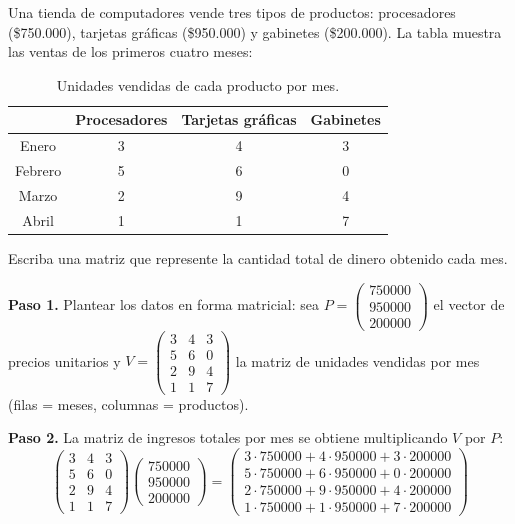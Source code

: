 \begin{example}
Una tienda de computadores vende tres tipos de productos: procesadores (\$750.000), tarjetas gráficas (\$950.000) y gabinetes (\$200.000). La tabla muestra las ventas de los primeros cuatro meses:

\begin{table}[H]\centering
\begin{tabular}{|c||c|c|c|}\hline
& Procesadores & Tarjetas gráficas & Gabinetes\\\hline
Enero & 3 & 4 & 3\\
Febrero & 5 & 6 & 0\\
Marzo & 2 & 9 & 4\\
Abril & 1 & 1 & 7\\\hline
\end{tabular}
\caption{Unidades vendidas de cada producto por mes.}
\end{table}

Escriba una matriz que represente la cantidad total de dinero obtenido cada mes.

\begin{myproof}
\textbf{Paso 1.} Plantear los datos en forma matricial: sea $P = \begin{pmatrix} 750000 \\ 950000 \\ 200000 \end{pmatrix}$ el vector de precios unitarios y $V = \begin{pmatrix}
3 & 4 & 3 \\
5 & 6 & 0 \\
2 & 9 & 4 \\
1 & 1 & 7
\end{pmatrix}$ la matriz de unidades vendidas por mes (filas = meses, columnas = productos).

\textbf{Paso 2.} La matriz de ingresos totales por mes se obtiene multiplicando $V$ por $P$:
\[
\begin{pmatrix}
3 & 4 & 3 \\
5 & 6 & 0 \\
2 & 9 & 4 \\
1 & 1 & 7 
\end{pmatrix}
\begin{pmatrix}
750000 \\ 950000 \\ 200000
\end{pmatrix}
= \begin{pmatrix}
3\cdot750000 + 4\cdot950000 + 3\cdot200000 \\
5\cdot750000 + 6\cdot950000 + 0\cdot200000 \\
2\cdot750000 + 9\cdot950000 + 4\cdot200000 \\
1\cdot750000 + 1\cdot950000 + 7\cdot200000
\end{pmatrix}
\]


\end{myproof}
\end{example}
